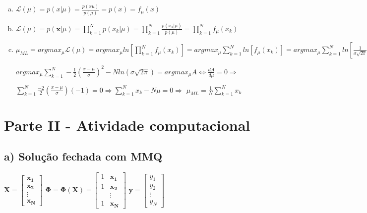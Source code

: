 \documentclass[a4paper, 12pt]{article}
\begin{document}
\begin{enumerate}[a)]
\item
    $\mathcal{L}(\mu) = p(x|\mu) = \frac{p(x\mu)}{p(\mu)} = p(x) = f_\mu(x)$

\item
    $\mathcal{L}(\mu) = p(\mathbf{x}|\mu) = \prod \limits _{k=1} ^{N} p(x_k|\mu) = \prod\limits_{k=1}^{N} \frac{p(x_k|\mu)}{p(\mu)} = \prod\limits_{k=1}^{N} f_\mu(x_k)$

\item

    $\mu_{ML} = arg max_\mu \mathcal{L}(\mu) = arg max_\mu ln \left [ \prod\limits_{k=1}^{N} f_\mu(x_k) \right ] =arg max_\mu \sum \limits_{k=1}^{N} ln [ f_\mu (x_k) ] = arg max_\mu \sum \limits_{k=1}^{N} ln \left [ \frac{1}{\sigma \sqrt{2\pi }} e^{- \frac{1}{2} \left (\frac{x - \mu}{\sigma} \right ) ^2} \right ] =  arg max_\mu \sum \limits_{k=1}^{N} \left [ ln \left ( \frac{1}{\sigma \sqrt{2\pi }} \right ) - \frac{1}{2} \left (\frac{x - \mu}{\sigma} \right )^2 \right ] =$
        
        $arg max_\mu \sum \limits_{k=1}^{N} - \frac{1}{2} \left (\frac{x - \mu}{\sigma} \right )^2 - N ln ( \sigma \sqrt{2 \pi} ) = argmax _\mu A \iff \frac{dA}{d\mu} = 0 \Rightarrow$

        $\sum \limits _{k=1} ^N \frac{-2}{2} \left ( \frac{x - \mu}{\sigma} \right ) ( -1 ) = 0 \Rightarrow \sum \limits _{k=1}^N x_k - N\mu = 0 \Rightarrow$
        $\mu_{ML} = \frac{1}{N} \sum \limits _{k=1}^{N} x_k $

\end{enumerate}

\newpage

\section*{Parte II - Atividade computacional}

\subsection*{a) Solução fechada com MMQ}

$
\mathbf{X} =\begin{bmatrix}
    \mathbf{x_1} \\
    \mathbf{x_2} \\
    \vdots \\
    \mathbf{x_N}
\end{bmatrix}
$
\hspace{2em}
$
\boldsymbol{\Phi} = \boldsymbol{\Phi}(\mathbf{X}) = \begin{bmatrix}
    1 & \mathbf{x_1} \\
    1 & \mathbf{x_2} \\
    &\vdots \\
    1 & \mathbf{x_N}
\end{bmatrix}
$
\hspace{2em}
$
\mathbf{y} =\begin{bmatrix}
    y_1 \\
    y_2 \\
    \vdots \\
    y_N
\end{bmatrix}
$
\end{document}
